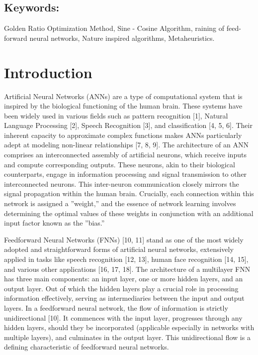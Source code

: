 \subsection{Keywords:}

Golden Ratio Optimization Method, Sine - Cosine Algorithm, raining of feed-forward neural networks, Nature inspired algorithms, Metaheuristics.

\section{Introduction}

Artificial Neural Networks (ANNs) are a type of computational system that is inspired by the biological functioning of the human brain. These systems have been widely used in various fields such as pattern recognition [1], Natural Language Processing [2], Speech Recognition [3], and classification [4, 5, 6]. Their inherent capacity to approximate complex functions makes ANNs particularly adept at modeling non-linear relationships [7, 8, 9]. The architecture of an ANN comprises an interconnected assembly of artificial neurons, which receive inputs and compute corresponding outputs. These neurons, akin to their biological counterparts, engage in information processing and signal transmission to other interconnected neurons. This inter-neuron communication closely mirrors the signal propagation within the human brain. Crucially, each connection within this network is assigned a ”weight,” and the essence of network learning involves determining the optimal values of these weights in conjunction with an additional input factor known as the ”bias.”

Feedforward Neural Networks (FNNs) [10, 11] stand as one of the most widely adopted and straightforward forms of artificial neural networks, extensively applied in tasks like speech recognition [12, 13], human face recognition [14, 15], and various other applications [16, 17, 18]. The architecture of a multilayer FNN has three main components: an input layer, one or more hidden layers, and an output layer. Out of which the hidden layers play a crucial role in processing information effectively, serving as intermediaries between the input and output layers. In a feedforward neural network, the flow of information is strictly unidirectional [10]. It commences with the input layer, progresses through any hidden layers, should they be incorporated (applicable especially in networks with multiple layers), and culminates in the output layer. This unidirectional flow is a defining characteristic of feedforward neural networks.

